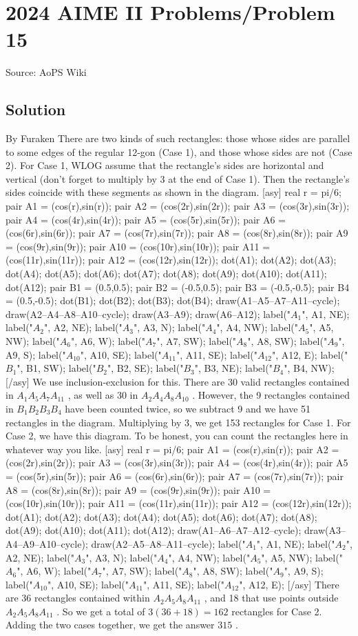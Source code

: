 \documentclass[12pt]{article}
\begin{document}
\section*{{2024 AIME II Problems/Problem 15}}
Source: AoPS Wiki

\subsection*{Solution}
By Furaken There are two kinds of such rectangles: those whose sides are parallel to some edges of the regular 12-gon (Case 1), and those whose sides are not (Case 2). For Case 1, WLOG assume that the rectangle's sides are horizontal and vertical (don't forget to multiply by 3 at the end of Case 1). Then the rectangle's sides coincide with these segments as shown in the diagram. [asy] real r = pi/6; pair A1 = (cos(r),sin(r)); pair A2 = (cos(2r),sin(2r)); pair A3 = (cos(3r),sin(3r)); pair A4 = (cos(4r),sin(4r)); pair A5 = (cos(5r),sin(5r)); pair A6 = (cos(6r),sin(6r)); pair A7 = (cos(7r),sin(7r)); pair A8 = (cos(8r),sin(8r)); pair A9 = (cos(9r),sin(9r)); pair A10 = (cos(10r),sin(10r)); pair A11 = (cos(11r),sin(11r)); pair A12 = (cos(12r),sin(12r)); dot(A1); dot(A2); dot(A3); dot(A4); dot(A5); dot(A6); dot(A7); dot(A8); dot(A9); dot(A10); dot(A11); dot(A12); pair B1 = (0.5,0.5); pair B2 = (-0.5,0.5); pair B3 = (-0.5,-0.5); pair B4 = (0.5,-0.5); dot(B1); dot(B2); dot(B3); dot(B4); draw(A1--A5--A7--A11--cycle); draw(A2--A4--A8--A10--cycle); draw(A3--A9); draw(A6--A12); label("$A_1$", A1, NE); label("$A_2$", A2, NE); label("$A_3$", A3, N); label("$A_4$", A4, NW); label("$A_5$", A5, NW); label("$A_6$", A6, W); label("$A_7$", A7, SW); label("$A_8$", A8, SW); label("$A_9$", A9, S); label("$A_{10}$", A10, SE); label("$A_{11}$", A11, SE); label("$A_{12}$", A12, E); label("$B_1$", B1, SW); label("$B_2$", B2, SE); label("$B_3$", B3, NE); label("$B_4$", B4, NW); [/asy] We use inclusion-exclusion for this. There are 30 valid rectangles contained in $A_1A_5A_7A_{11}$ , as well as 30 in $A_2A_4A_8A_{10}$ . However, the 9 rectangles contained in $B_1B_2B_3B_4$ have been counted twice, so we subtract 9 and we have 51 rectangles in the diagram. Multiplying by 3, we get 153 rectangles for Case 1. For Case 2, we have this diagram. To be honest, you can count the rectangles here in whatever way you like. [asy] real r = pi/6; pair A1 = (cos(r),sin(r)); pair A2 = (cos(2r),sin(2r)); pair A3 = (cos(3r),sin(3r)); pair A4 = (cos(4r),sin(4r)); pair A5 = (cos(5r),sin(5r)); pair A6 = (cos(6r),sin(6r)); pair A7 = (cos(7r),sin(7r)); pair A8 = (cos(8r),sin(8r)); pair A9 = (cos(9r),sin(9r)); pair A10 = (cos(10r),sin(10r)); pair A11 = (cos(11r),sin(11r)); pair A12 = (cos(12r),sin(12r)); dot(A1); dot(A2); dot(A3); dot(A4); dot(A5); dot(A6); dot(A7); dot(A8); dot(A9); dot(A10); dot(A11); dot(A12); draw(A1--A6--A7--A12--cycle); draw(A3--A4--A9--A10--cycle); draw(A2--A5--A8--A11--cycle); label("$A_1$", A1, NE); label("$A_2$", A2, NE); label("$A_3$", A3, N); label("$A_4$", A4, NW); label("$A_5$", A5, NW); label("$A_6$", A6, W); label("$A_7$", A7, SW); label("$A_8$", A8, SW); label("$A_9$", A9, S); label("$A_{10}$", A10, SE); label("$A_{11}$", A11, SE); label("$A_{12}$", A12, E); [/asy] There are 36 rectangles contained within $A_2A_5A_8A_{11}$ , and 18 that use points outside $A_2A_5A_8A_{11}$ . So we get a total of $3(36+18)=162$ rectangles for Case 2. Adding the two cases together, we get the answer $\boxed{315}$ .
\end{document}
